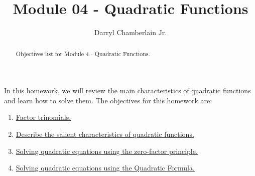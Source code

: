 \documentclass{ximera}
\author{Darryl Chamberlain Jr.}
\title{Module 04 - Quadratic Functions}
\begin{document}
\begin{abstract}
Objectives list for Module 4 - Quadratic Functions.
\end{abstract}
\maketitle

In this homework, we will review the main characteristics of quadratic functions and learn how to solve them. The objectives for this homework are:
\begin{enumerate}
	\item \href{https://cnx.org/contents/mwjClAV_@8.1:Sc8taR03@9/Factoring-Polynomials}{Factor trinomials.}
	\item \href{https://cnx.org/contents/mwjClAV_@8.1:-Sm9he1Q@17/Quadratic-Functions}{Describe the salient characteristics of quadratic functions.}
	\item \href{https://cnx.org/contents/mwjClAV_@8.1:-Sm9he1Q@17/Quadratic-Functions}{Solving quadratic equations using the zero-factor principle.}
	\item \href{https://cnx.org/contents/mwjClAV_@8.1:-Sm9he1Q@17/Quadratic-Functions}{Solving quadratic equations using the Quadratic Formula.}
\end{enumerate}
\end{document}
